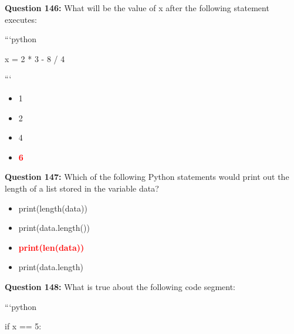 \documentclass[12pt,a4paper]{article}
\begin{document}
\vspace{0.5cm}

\textbf{Question 146:} What will be the value of x after the following statement executes:\newline

\newline
\newline

\newline
```python\newline

\newline
x = 2 * 3 - 8 / 4 %

\newline
```

\begin{itemize}
    \item[\textbf{A.}] 1
    \item[\textbf{B.}] 2
    \item[\textbf{C.}] 4
    \item[\textbf{D.}] \textcolor{red}{\textbf{6}}
\end{itemize}

\vspace{0.5cm}

\textbf{Question 147:} Which of the following Python statements would print out the length of a list stored in the variable data?

\begin{itemize}
    \item[\textbf{A.}] print(length(data))
    \item[\textbf{B.}] print(data.length())
    \item[\textbf{C.}] \textcolor{red}{\textbf{print(len(data))}}
    \item[\textbf{D.}] print(data.length)
\end{itemize}

\vspace{0.5cm}

\textbf{Question 148:} What is true about the following code segment:\newline

\newline
\newline

\newline
```python\newline

\newline
if x == 5:\newline
\end{document}
